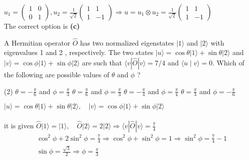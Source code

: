 \begin{enumerate}
\begin{tasks}
\end{tasks}
\begin{answer}
$u_{1}=\left(\begin{array}{ll}
	1 & 0 \\
	0 & 1
\end{array}\right), u_{2}=\frac{1}{\sqrt{2}}\left(\begin{array}{cc}
	1 & 1 \\
	1 & -1
\end{array}\right) \Rightarrow u=u_{1} \otimes u_{2}=\frac{1}{\sqrt{2}}\left(\begin{array}{cc}
	1 & 1 \\
	1 & -1
\end{array}\right)$\\
The correct option is \textbf{(c)}	
\end{answer}
\begin{minipage}{\textwidth}
\item A Hermitian operator $\hat{O}$ has two normalized eigenstates $|1\rangle$ and $|2\rangle$ with eigenvalues 1 and 2 , respectively. The two states $|u\rangle=\cos \theta|1\rangle+\sin \theta|2\rangle$ and $|v\rangle=\cos \phi|1\rangle+\sin \phi|2\rangle$ are such that $\langle v|\hat{O}| v\rangle=7 / 4$ and $\langle u \mid v\rangle=0$. Which of the following are possible values of $\theta$ and $\phi$ ?
\end{minipage}
\begin{tasks}(2)
	\task[\textbf{A.}] $\theta=-\frac{\pi}{6}$ and $\phi=\frac{\pi}{3}$
	\task[\textbf{B.}]$\theta=\frac{\pi}{6}$ and $\phi=\frac{\pi}{3}$
	\task[\textbf{C.}]$\theta=-\frac{\pi}{4}$ and $\phi=\frac{\pi}{4}$
	\task[\textbf{D.}]$\theta=\frac{\pi}{3}$ and $\phi=-\frac{\pi}{6}$
\end{tasks}
\begin{answer}
	$|u\rangle=\cos \theta|1\rangle+\sin \theta|2\rangle, \quad|v\rangle=\cos \phi|1\rangle+\sin \phi|2\rangle$\\\\
	it is given
	$\hat{O}|1\rangle=|1\rangle, \quad \hat{O}|2\rangle=2|2\rangle \Rightarrow\langle v|\hat{O}| v\rangle=\frac{7}{4}$\\
	\begin{align*}
		&\cos ^{2} \phi+2 \sin ^{2} \phi=\frac{7}{4} \Rightarrow \cos ^{2} \phi+\sin ^{2} \phi=1 \Rightarrow \sin ^{2} \phi=\frac{7}{4}-1 \\
		&\sin \phi=\frac{\sqrt{3}}{2} \Rightarrow \phi=\frac{\pi}{3} \\

\end{align*}
\end{answer}
\end{enumerate}
